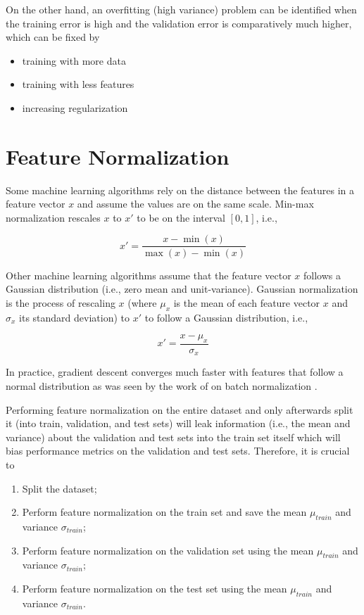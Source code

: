 On the other hand, an overfitting (high variance) problem can be identified when the training error is high and the validation error is comparatively much higher, which can be fixed by

\begin{itemize}
    \item training with more data
    \item training with less features
    \item increasing regularization
\end{itemize}

\section{Feature Normalization}

Some machine learning algorithms rely on the distance between the features in a feature vector $x$ and assume the values are on the same scale. Min-max normalization rescales $x$ to $x'$ to be on the interval $[0, 1]$, i.e.,

$$
x' = \frac{x - \min{(x)}}{\max{(x)} - \min{(x)}}
$$

Other machine learning algorithms assume that the feature vector $x$ follows a Gaussian distribution (i.e., zero mean and unit-variance). Gaussian normalization is the process of rescaling $x$ (where $\mu_x$ is the mean of each feature vector $x$ and $\sigma_x$ its standard deviation) to $x'$ to follow a Gaussian distribution, i.e.,

$$
x' = \frac{x - \mu_x}{\sigma_x}
$$

In practice, gradient descent converges much faster with features that follow a normal distribution as was seen by the work of \citeauthor{batchnormalization} on batch normalization \cite{batchnormalization}.

Performing feature normalization on the entire dataset and only afterwards split it (into train, validation, and test sets) will leak information (i.e., the mean and variance) about the validation and test sets into the train set itself which will bias performance metrics on the validation and test sets. Therefore, it is crucial to

\begin{enumerate}
    \item Split the dataset;
    \item Perform feature normalization on the train set and save the mean $\mu_{train}$ and variance $\sigma_{train}$;
    \item Perform feature normalization on the validation set using the mean $\mu_{train}$ and variance $\sigma_{train}$;
    \item Perform feature normalization on the test set using the mean $\mu_{train}$ and variance $\sigma_{train}$.
\end{enumerate}


